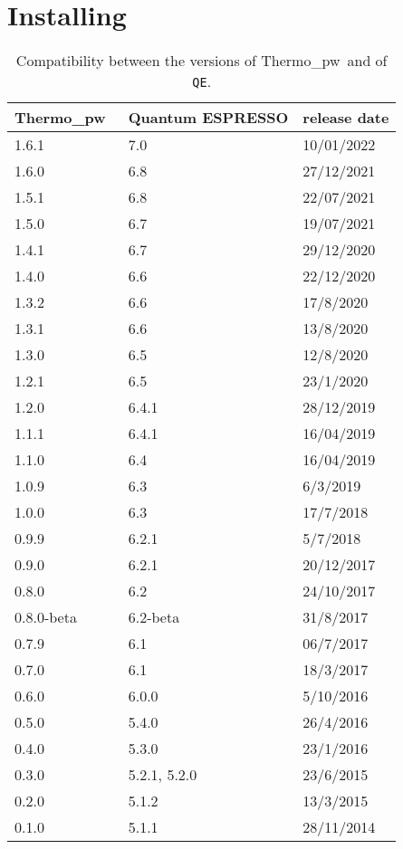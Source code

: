 \documentclass[12pt,a4paper,twoside]{report}
\def\qe{{\sc Quantum ESPRESSO}}
\def\thermo{{\sc Thermo}\_{\sc pw}}
\begin{document}
{\color{coral}\section{Installing}}
\color{black}
\begin{table}
\begin{center}
\begin{tabular}{lll}
\hline
\hline
\thermo\ & \qe & release date \\
\hline
1.6.1 & 7.0 & 10/01/2022 \\
1.6.0 & 6.8 & 27/12/2021 \\
1.5.1 & 6.8 & 22/07/2021 \\
1.5.0 & 6.7 & 19/07/2021 \\
1.4.1 & 6.7 & 29/12/2020 \\
1.4.0 & 6.6 & 22/12/2020 \\
1.3.2 & 6.6 & 17/8/2020 \\
1.3.1 & 6.6 & 13/8/2020 \\
1.3.0 & 6.5 & 12/8/2020 \\
1.2.1 & 6.5 & 23/1/2020 \\
1.2.0 & 6.4.1 & 28/12/2019 \\
1.1.1 & 6.4.1 & 16/04/2019 \\
1.1.0 & 6.4 & 16/04/2019 \\
1.0.9 & 6.3 & 6/3/2019 \\
1.0.0 & 6.3 & 17/7/2018 \\
0.9.9 & 6.2.1 & 5/7/2018 \\
0.9.0 & 6.2.1 & 20/12/2017 \\
0.8.0 & 6.2 & 24/10/2017 \\
0.8.0-beta & 6.2-beta & 31/8/2017\\
0.7.9 & 6.1 & 06/7/2017 \\
0.7.0 & 6.1 & 18/3/2017 \\
0.6.0 & 6.0.0 & 5/10/2016 \\
0.5.0 & 5.4.0 & 26/4/2016 \\
0.4.0 & 5.3.0 & 23/1/2016 \\
0.3.0 & 5.2.1, 5.2.0 & 23/6/2015 \\
0.2.0 & 5.1.2 & 13/3/2015 \\
0.1.0 & 5.1.1 & 28/11/2014 \\
\hline
\hline
\end{tabular}
\caption{Compatibility between the versions of 
\thermo\ and of \texttt{QE}.}
\end{center}
\end{table}
\end{document}
